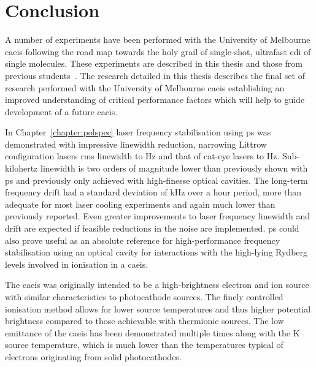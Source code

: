 \chapter{Conclusion}
\glsresetall

A number of experiments have been performed with the University of Melbourne \gls{caeis} following the road map towards the holy grail of single-shot, ultrafast \gls{cdi} of single molecules.
These experiments are described in this thesis and those from previous students~\cite{sheludko_shaped_2010,bell_cold_2011,saliba_cold_2011,mcculloch_generation_2013,taylor_rydberg_2013,tielen_development_2015,murphy_measurement_2017,speirs_electron_2017}.
The research detailed in this thesis describes the final set of research performed with the University of Melbourne \gls{caeis} establishing an improved understanding of critical performance factors which will help to guide development of a future \gls{caeis}.

In Chapter~\ref{chapter:polspec} laser frequency stabilisation using \gls{ps} was demonstrated with impressive linewidth reduction, narrowing Littrow configuration lasers \gls{rms} linewidth to \unit[600]{Hz} and that of cat-eye lasers to \unit[360]{Hz}.
Sub-kilohertz linewidth is two orders of magnitude lower than previously shown with \gls{ps} and previously only achieved with high-finesse optical cavities.
The long-term frequency drift had a standard deviation of \unit[51]{kHz} over a \unit[60]{hour} period, more than adequate for most laser cooling experiments and again much lower than previously reported.
Even greater improvements to laser frequency linewidth and drift are expected if feasible reductions in the noise are implemented.
\Gls{ps} could also prove useful as an absolute reference for high-performance frequency stabilisation using an optical cavity for interactions with the high-lying Rydberg levels involved in ionisation in a \gls{caeis}.

The \gls{caeis} was originally intended to be a high-brightness electron and ion source with similar characteristics to photocathode sources.
The finely controlled ionisation method allows for lower source temperatures and thus higher potential brightness compared to those achievable with thermionic sources.
The low emittance of the \gls{caeis} has been demonstrated multiple times along with the \unit[10]{K} source temperature, which is much lower than the temperatures typical of electrons originating from solid photocathodes.

